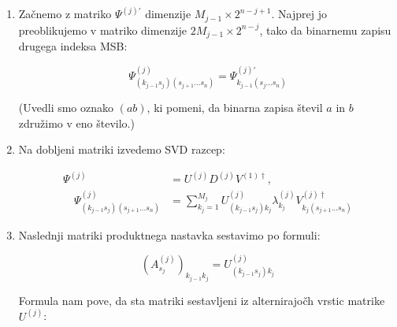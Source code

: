 \documentclass[a4paper]{article}
\newcommand{\seq}[2]{#1 \ldots #2}
\begin{document}
    \begin{enumerate}
        \item Začnemo z matriko $\Psi^{(j)\prime}$ dimenzije $M_{j-1} \times 2^{n-j+1}$. Najprej jo preoblikujemo v matriko dimenzije
            $2M_{j-1} \times 2^{n-j}$, tako da binarnemu zapisu drugega indeksa  MSB:

            \begin{equation}\label{eq8}
                \Psi^{(j)}_{(k_{j-1}s_j)(\seq{s_{j+1}}{s_n})} = \Psi^{(j)\prime}_{k_{j-1}(\seq{s_{j}}{s_n})}
            \end{equation}

            (Uvedli smo oznako $(ab)$, ki pomeni, da binarna zapisa števil $a$ in $b$ združimo v eno število.)

        \item Na dobljeni matriki izvedemo SVD razcep:

            \begin{equation}\label{eq9}
                \begin{split}
                    \Psi^{(j)} &= U^{(j)} D^{(j)} V^{(1)\dagger}, \\
                    \quad
                    \Psi^{(j)}_{(k_{j-1}s_j)(\seq{s_{j+1}}{s_n})}
                    &= \sum_{k_j=1}^{M_j} U^{(j)}_{(k_{j-1}s_j)k_j} \lambda^{(j)}_{k_j} V^{(j)\dagger}_{k_j(\seq{s_{j+1}}{s_n})}
                \end{split}
            \end{equation}

        \item Naslednji matriki produktnega nastavka sestavimo po formuli:

            \begin{equation}\label{eq10}
                \left( A^{(j)}_{s_j} \right)_{k_{j-1}k_j} = U^{(j)}_{(k_{j-1}s_j)k_j}
            \end{equation}

            Formula nam pove, da sta matriki sestavljeni iz alternirajočh vrstic matrike $U^{(j)}$:


\end{enumerate}
\end{document}
